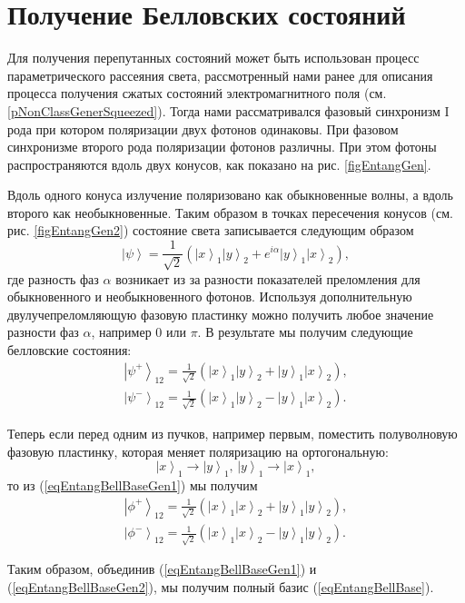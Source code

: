 \section{Получение Белловских состояний}
\label{subsecPart3NonclassEntanglBelGener}

Для получения перепутанных состояний может быть использован процесс
параметрического рассеяния света, рассмотренный нами ранее для
описания процесса получения сжатых состояний электромагнитного
поля (см. \ref{pNonClassGenerSqueezed}). Тогда нами рассматривался
фазовый синхронизм I рода при котором поляризации двух фотонов
одинаковы. При фазовом синхронизме второго рода поляризации фотонов
различны. При этом фотоны распространяются вдоль двух конусов, как
показано на рис. \ref{figEntangGen}. 



Вдоль одного конуса излучение поляризовано
как обыкновенные волны, а вдоль второго как необыкновенные. Таким
образом в точках пересечения конусов (см. рис. \ref{figEntangGen2})
состояние света записывается следующим образом
\begin{equation}
\left|\psi\right> =
  \frac{1}{\sqrt{2}}\left(
  \left|x\right>_1\left|y\right>_2 + e^{i \alpha}
  \left|y\right>_1\left|x\right>_2
  \right),
\nonumber
\end{equation}
где разность фаз $\alpha$ возникает из за разности показателей
преломления для обыкновенного и необыкновенного фотонов. Используя
дополнительную двулучепреломляющую фазовую пластинку можно получить
любое значение разности фаз
$\alpha$, например $0$ или $\pi$. В результате мы получим следующие белловские состояния:
\begin{eqnarray}
  \left|\psi^{+}\right>_{12} = 
  \frac{1}{\sqrt{2}}\left(
  \left|x\right>_1\left|y\right>_2 + 
  \left|y\right>_1\left|x\right>_2
  \right),
  \nonumber \\
  \left|\psi^{-}\right>_{12} = 
  \frac{1}{\sqrt{2}}\left(
  \left|x\right>_1\left|y\right>_2 - 
  \left|y\right>_1\left|x\right>_2
  \right).
  \label{eqEntangBellBaseGen1}
\end{eqnarray}



Теперь если перед одним из пучков, например первым, поместить полуволновую фазовую
пластинку, которая меняет поляризацию на ортогональную:
\begin{equation}
\left|x\right>_1 \rightarrow \left|y\right>_1, \, \left|y\right>_1 \rightarrow \left|x\right>_1,
\nonumber
\end{equation}
то из (\ref{eqEntangBellBaseGen1}) мы получим
\begin{eqnarray}
  \left|\phi^{+}\right>_{12} = 
  \frac{1}{\sqrt{2}}\left(
  \left|x\right>_1\left|x\right>_2 + 
  \left|y\right>_1\left|y\right>_2
  \right),
  \nonumber \\
  \left|\phi^{-}\right>_{12} = 
  \frac{1}{\sqrt{2}}\left(
  \left|x\right>_1\left|x\right>_2 - 
  \left|y\right>_1\left|y\right>_2
  \right).
  \label{eqEntangBellBaseGen2}
\end{eqnarray}

Таким образом, объединив (\ref{eqEntangBellBaseGen1}) и
(\ref{eqEntangBellBaseGen2}), мы получим полный базис (\ref{eqEntangBellBase}).



